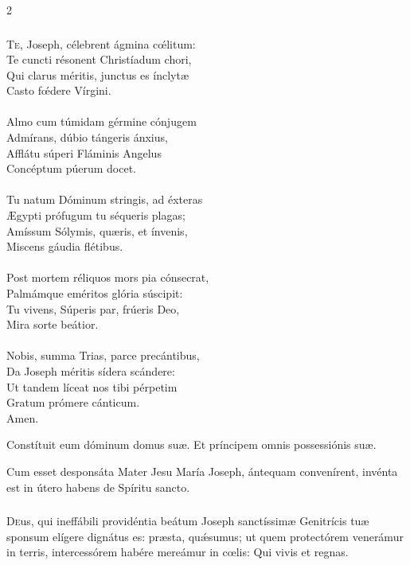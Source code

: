 \documentclass[9pt,twoside]{extarticle}
\begin{document}
\begin{multicols}{2}
\subsubsection*{\center {}}
\lettrine{T}e, Joseph, célebrent ágmina cœ́litum:\\
Te cuncti résonent Christíadum chori,\\
Qui clarus méritis, junctus es ínclytæ\\
Casto fœ́dere Vírgini.\\
\\
Almo cum túmidam gérmine cónjugem\\
Admírans, dúbio tángeris ánxius,\\
Afflátu súperi Fláminis Angelus\\
Concéptum púerum docet.\\
\\
Tu natum Dóminum stringis, ad éxteras\\
Ægypti prófugum tu séqueris plagas;\\
Amíssum Sólymis, quæris, et ínvenis,\\
Miscens gáudia flétibus.\\
\\
Post mortem réliquos mors pia cónsecrat,\\
Palmámque eméritos glória súscipit:\\
Tu vivens, Súperis par, frúeris Deo,\\
Mira sorte beátior.\\
\\
Nobis, summa Trias, parce precántibus,\\
Da Joseph méritis sídera scándere:\\
Ut tandem líceat nos tibi pérpetim\\
Gratum prómere cánticum.\\
Amen.

\begin{tightlist}{}
\item {} Constítuit eum dóminum domus suæ.  Et príncipem omnis possessiónis suæ.
\item {} Cum esset desponsáta Mater Jesu María Joseph, ántequam convenírent, invénta est in útero habens de Spíritu sancto.
\end{tightlist}

\subsubsection*{\center {}}
\lettrine{D}eus, qui ineffábili providéntia beátum Joseph sanctíssimæ Genitrícis tuæ sponsum elígere dignátus es: præsta, quǽsumus; ut quem protectórem venerámur in terris, intercessórem habére mereámur in cœlis: Qui vivis et regnas.


\end{multicols}
\end{document}
